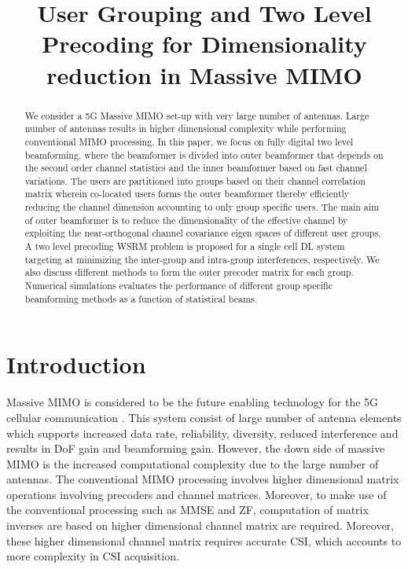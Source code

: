\documentclass{article}
\title{User Grouping and Two Level Precoding for Dimensionality reduction in Massive MIMO}
\begin{document}
	\maketitle
\vspace{-1eM}
\begin{abstract}
We consider a 5G Massive \ac{MIMO} set-up with very large number of antennas. Large number of antennas results in higher dimensional complexity while performing conventional \ac{MIMO} processing. In this paper, we focus on fully digital two level beamforming, where the beamformer is divided into outer beamformer that depends on the second order channel statistics and the inner beamformer based on fast channel variations. The users are partitioned into groups based on their channel correlation matrix wherein co-located users forms the outer beamformer thereby efficiently reducing the channel dimension accounting to only group specific users. The main aim of outer beamformer is to reduce the dimensionality of the effective channel by exploiting the near-orthogonal channel covariance eigen spaces of different user groups. A two level precoding \ac{WSRM} problem is proposed for a single cell \ac{DL} system targeting at minimizing the inter-group and intra-group interferences, respectively. We also discuss different methods to form the outer precoder matrix for each group. Numerical simulations evaluates the performance of different group specific beamforming methods as a function of statistical beams.
\end{abstract}
%

\section{Introduction}
\label{sec:intro}

Massive \ac{MIMO} is considered to be the future enabling technology for the 5G cellular communication \cite{ marzetta2010noncooperative, rusek2013scaling, boccardi2014five}. This system consist of large number of antenna elements which supports increased data rate, reliability, diversity, reduced interference and results in \ac{DoF} gain and beamforming gain. However, the down side of massive \ac{MIMO} is the increased computational complexity due to the large number of antennas. The conventional \ac{MIMO} processing involves higher dimensional matrix operations involving precoders and channel matrices. Moreover, to make use of the conventional processing such as \ac{MMSE} and \ac{ZF}, computation of matrix inverses are based on higher dimensional channel matrix are required. Moreover, these higher dimensional channel matrix requires accurate \ac{CSI}, which accounts to more complexity in \ac{CSI} acquisition.
\end{document}
